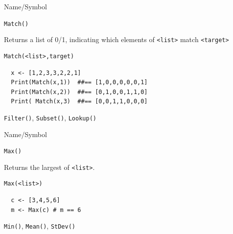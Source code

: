 \begin{desc}{Name/Symbol}
\item[Name/Symbol]	\verb+Match()+            

\item[Description] Returns a list of 0/1, indicating which elements of  \verb+<list>+ match \verb+<target>+

\item[Usage]		
\begin{verbatim}
Match(<list>,target)
\end{verbatim}

\item[Example]	
\begin{verbatim} 
  x <- [1,2,3,3,2,2,1]
  Print(Match(x,1))  ##== [1,0,0,0,0,0,1]
  Print(Match(x,2))  ##== [0,1,0,0,1,1,0]
  Print( Match(x,3)  ##== [0,0,1,1,0,0,0]

\end{verbatim}

\item[See Also]	\verb+Filter()+, \verb+Subset()+, \verb+Lookup()+
\end{desc}



\begin{desc}{Name/Symbol}
\item[Name/Symbol]	\verb+Max()+            

\item[Description] Returns the largest of \verb+<list>+.

\item[Usage]		
\begin{verbatim}
Max(<list>)
\end{verbatim}

\item[Example]	
\begin{verbatim} 
  c <- [3,4,5,6]
  m <- Max(c) # m == 6
\end{verbatim}

\item[See Also]	\verb+Min()+, \verb+Mean()+, \verb+StDev()+
\end{desc}



